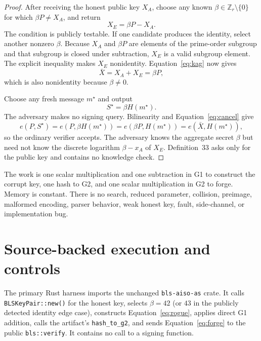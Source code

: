 \documentclass[10pt,a4paper]{article}
\newcommand{\Zr}{\mathbb{Z}_r}
\begin{document}
\begin{proof}
After receiving the honest public key $X_A$, choose any known
$\beta\in\Zr\setminus\{0\}$ for which $\beta P\neq X_A$, and return
\begin{equation}
  X_E=\beta P-X_A.                                     \label{eq:rogue}
\end{equation}
The condition is publicly testable. If one candidate produces the identity,
select another nonzero $\beta$. Because $X_A$ and $\beta P$ are elements of
the prime-order subgroup and that subgroup is closed under subtraction,
$X_E$ is a valid subgroup element. The explicit inequality makes $X_E$
nonidentity. Equation~\eqref{eq:kag} now gives
\begin{equation}
  \bar X=X_A+X_E=\beta P,                              \label{eq:cancel}
\end{equation}
which is also nonidentity because $\beta\neq0$.

Choose any fresh message $m^\star$ and output
\begin{equation}
  S^\star=\beta H(m^\star).                            \label{eq:forge}
\end{equation}
The adversary makes no signing query. Bilinearity and
Equation~\eqref{eq:cancel} give
\[
 e(P,S^\star)
 =e(P,\beta H(m^\star))
 =e(\beta P,H(m^\star))
 =e(\bar X,H(m^\star)),
\]
so the ordinary verifier accepts. The adversary knows the aggregate secret
$\beta$ but need not know the discrete logarithm $\beta-x_A$ of $X_E$.
Definition~33 asks only for the public key and contains no knowledge check.
\end{proof}

The work is one scalar multiplication and one subtraction in G1 to construct
the corrupt key, one hash to G2, and one scalar multiplication in G2 to forge.
Memory is constant. There is no search, reduced parameter, collision,
preimage, malformed encoding, parser behavior, weak honest key, fault,
side-channel, or implementation bug.

\section{Source-backed execution and controls}

The primary Rust harness imports the unchanged \texttt{bls-aiso-as} crate. It
calls \texttt{BLSKeyPair::new()} for the honest key, selects $\beta=42$ (or
$43$ in the publicly detected identity edge case), constructs
Equation~\eqref{eq:rogue}, applies direct G1 addition, calls the artifact's
\texttt{hash\_to\_g2}, and sends Equation~\eqref{eq:forge} to the public
\texttt{bls::verify}. It contains no call to a signing function.
\end{document}
